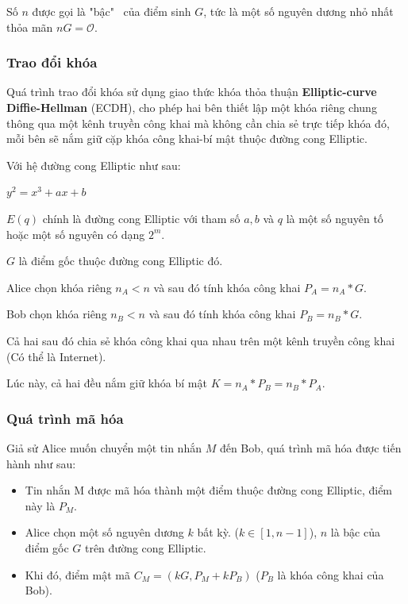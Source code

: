 	Số $n$ được gọi là "bậc"~ của điểm sinh $G$, tức là một số nguyên dương nhỏ nhất thỏa mãn $nG = \mathcal {O}$.

\subsubsection{Trao đổi khóa}

Quá trình trao đổi khóa sử dụng giao thức khóa thỏa thuận \textbf{Elliptic-curve Diffie-Hellman} (ECDH), cho phép hai bên thiết lập một khóa riêng chung thông qua một kênh truyền công khai mà không cần chia sẻ trực tiếp khóa đó, mỗi bên sẽ nắm giữ cặp khóa công khai-bí mật thuộc đường cong Elliptic.

Với hệ đường cong Elliptic như sau:
\begin{center}
	$y^2 = x^3 + ax + b$
\end{center}

$E(q)$ chính là đường cong Elliptic với tham số $a,b$ và $q$ là một số nguyên tố hoặc một số nguyên có dạng $2^m$.

$G$ là điểm gốc thuộc đường cong Elliptic đó.

Alice chọn khóa riêng $n_A < n$ và sau đó tính khóa công khai $P_A = n_A * G$.

Bob chọn khóa riêng $n_B < n$ và sau đó tính khóa công khai $P_B = n_B * G$.

Cả hai sau đó chia sẻ khóa công khai qua nhau trên một kênh truyền công khai (Có thể là Internet).

Lúc này, cả hai đều nắm giữ khóa bí mật $K = n_A * P_B = n_B * P_A$.

\subsubsection{Quá trình mã hóa}

Giả sử Alice muốn chuyển một tin nhắn $M$ đến Bob, quá trình mã hóa được tiến hành như sau:

\begin{itemize}
	\item Tin nhắn M được mã hóa thành một điểm thuộc đường cong Elliptic, điểm này là $P_M$.
	\item Alice chọn một số nguyên dương $k$ bất kỳ. ($k \in [1,n-1]$), $n$ là bậc của điểm gốc $G$ trên đường cong Elliptic.
	\item Khi đó, điểm mật mã $C_M = (kG, P_M + kP_B)$ ($P_B$ là khóa công khai của Bob).
\end{itemize}

